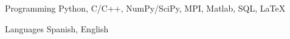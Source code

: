 

\begin{cvskills}

  \cvskill
    {Programming} %
    {Python, C/C++, NumPy/SciPy, MPI, Matlab, SQL, LaTeX} %

  \cvskill
    {Languages} %
    {Spanish, English} %

\end{cvskills}
